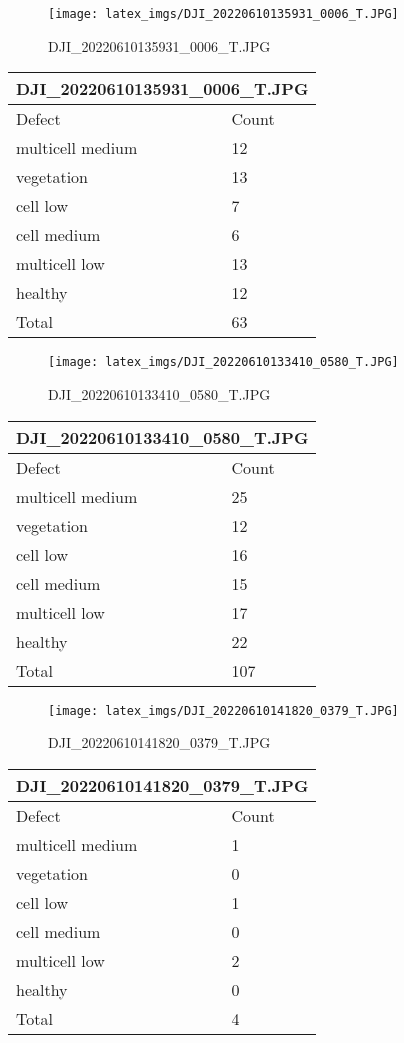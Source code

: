 \documentclass{article}%
\begin{document}
\begin{figure}[h!]%
\centering%
\texttt{[image: latex\_imgs/DJI\_20220610135931\_0006\_T.JPG]}%
\caption{DJI\_20220610135931\_0006\_T.JPG}%
\end{figure}

%
\begin{longtable}[c]{|l|l|}%
\hline%
\multicolumn{2}{|c|}{DJI\_20220610135931\_0006\_T.JPG}\\%
\hline%
Defect&Count\\%
\hline%
\endhead%
\hline%
multicell medium&12\\%
vegetation&13\\%
cell low&7\\%
cell medium&6\\%
multicell low&13\\%
healthy&12\\%
\hline%
Total&63\\%
\hline%
\end{longtable}%
\newpage%


\begin{figure}[h!]%
\centering%
\texttt{[image: latex\_imgs/DJI\_20220610133410\_0580\_T.JPG]}%
\caption{DJI\_20220610133410\_0580\_T.JPG}%
\end{figure}

%
\begin{longtable}[c]{|l|l|}%
\hline%
\multicolumn{2}{|c|}{DJI\_20220610133410\_0580\_T.JPG}\\%
\hline%
Defect&Count\\%
\hline%
\endhead%
\hline%
multicell medium&25\\%
vegetation&12\\%
cell low&16\\%
cell medium&15\\%
multicell low&17\\%
healthy&22\\%
\hline%
Total&107\\%
\hline%
\end{longtable}%


\begin{figure}[h!]%
\centering%
\texttt{[image: latex\_imgs/DJI\_20220610141820\_0379\_T.JPG]}%
\caption{DJI\_20220610141820\_0379\_T.JPG}%
\end{figure}

%
\begin{longtable}[c]{|l|l|}%
\hline%
\multicolumn{2}{|c|}{DJI\_20220610141820\_0379\_T.JPG}\\%
\hline%
Defect&Count\\%
\hline%
\endhead%
\hline%
multicell medium&1\\%
vegetation&0\\%
cell low&1\\%
cell medium&0\\%
multicell low&2\\%
healthy&0\\%
\hline%
Total&4\\%
\hline%
\end{longtable}%
\newpage%
\end{document}
